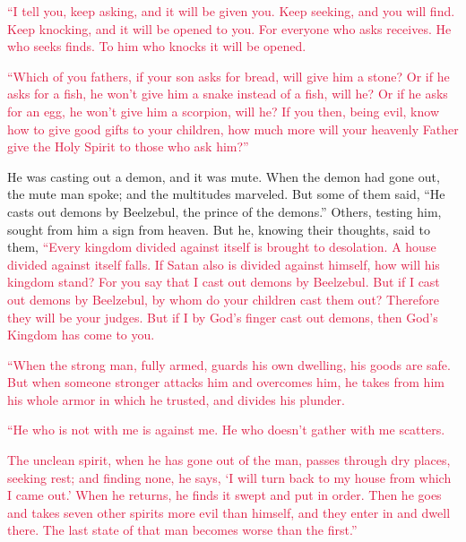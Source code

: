 \myverse{}\textcolor{crimson}{“I tell you, keep asking, and it will be given you. Keep seeking,
	and you will find. Keep knocking, and it will be opened to you.
}
\myverse{}\textcolor{crimson}{For everyone who asks receives. He who seeks finds. To him who knocks
	it will be opened.}

\myverse{}\textcolor{crimson}{“Which of you fathers, if your son asks for bread, will give him a stone? Or if he asks for a fish, he won’t give him a snake instead of a fish, will he?} \myverse{}\textcolor{crimson}{Or if he asks for an egg, he won’t give him a scorpion, will he?} \myverse{}\textcolor{crimson}{If you then, being evil, know how to give good gifts to your children, how much more will your heavenly Father give the Holy Spirit to those who ask him?”}

\myverse{}He was casting out a demon, and it was mute. When the demon
had gone out, the mute man spoke; and the multitudes marveled.
\myverse{}But some of them said, “He casts out demons by Beelzebul, the prince of the
demons.”
\myverse{}Others, testing him, sought from him a sign from heaven.
\myverse{}But he, knowing their thoughts, said to them,
\textcolor{crimson}{“Every kingdom divided against itself is brought to desolation. A house divided against itself falls.
}
\myverse{}\textcolor{crimson}{If Satan also is divided against himself, how will his kingdom stand?
	For you say that I cast out demons by Beelzebul.
}
\myverse{}\textcolor{crimson}{But if I cast out demons by Beelzebul, by whom do your children cast
	them out? Therefore they will be your judges.
}
\myverse{}\textcolor{crimson}{But if I by God’s finger cast out demons, then God’s Kingdom has come
	to you.}

\myverse{}\textcolor{crimson}{“When the strong man, fully armed, guards his own dwelling,
	his goods are safe.
}
\myverse{}\textcolor{crimson}{But when someone stronger attacks him and overcomes him, he takes from
	him his whole armor in which he trusted, and divides his plunder.
}

\myverse{}\textcolor{crimson}{“He who is not with me is against me. He who doesn’t gather
	with me scatters.}

\myverse{}\textcolor{crimson}{The unclean spirit, when he has gone out of the man, passes
	through dry places, seeking rest; and finding none, he says, ‘I will turn back to my house from which
	I came out.’
}
\myverse{}\textcolor{crimson}{When he returns, he finds it swept and put in order.
}
\myverse{}\textcolor{crimson}{Then he goes and takes seven other spirits more evil than himself, and
	they enter in and dwell there. The last state of that man becomes worse than the first.”}

